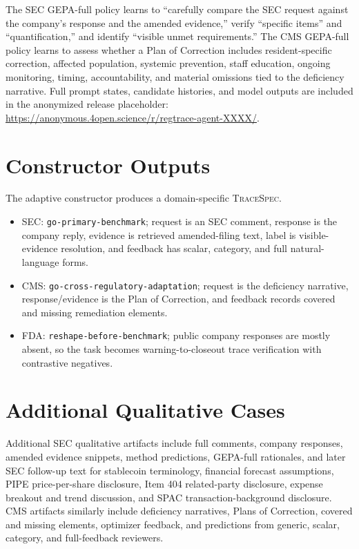 \documentclass[11pt]{article}
\begin{document}
The SEC GEPA-full policy learns to ``carefully compare the SEC request against the company's response and the amended evidence,'' verify ``specific items'' and ``quantification,'' and identify ``visible unmet requirements.'' The CMS GEPA-full policy learns to assess whether a Plan of Correction includes resident-specific correction, affected population, systemic prevention, staff education, ongoing monitoring, timing, accountability, and material omissions tied to the deficiency narrative. Full prompt states, candidate histories, and model outputs are included in the anonymized release placeholder: \url{https://anonymous.4open.science/r/regtrace-agent-XXXX/}.

\section{Constructor Outputs}
\label{app:constructor}

The adaptive constructor produces a domain-specific \textsc{TraceSpec}.
\begin{itemize}
    \item SEC: \texttt{go-primary-benchmark}; request is an SEC comment, response is the company reply, evidence is retrieved amended-filing text, label is visible-evidence resolution, and feedback has scalar, category, and full natural-language forms.
    \item CMS: \texttt{go-cross-regulatory-adaptation}; request is the deficiency narrative, response/evidence is the Plan of Correction, and feedback records covered and missing remediation elements.
    \item FDA: \texttt{reshape-before-benchmark}; public company responses are mostly absent, so the task becomes warning-to-closeout trace verification with contrastive negatives.
\end{itemize}

\section{Additional Qualitative Cases}
\label{app:cases}

Additional SEC qualitative artifacts include full comments, company responses, amended evidence snippets, method predictions, GEPA-full rationales, and later SEC follow-up text for stablecoin terminology, financial forecast assumptions, PIPE price-per-share disclosure, Item 404 related-party disclosure, expense breakout and trend discussion, and SPAC transaction-background disclosure. CMS artifacts similarly include deficiency narratives, Plans of Correction, covered and missing elements, optimizer feedback, and predictions from generic, scalar, category, and full-feedback reviewers.
\end{document}
